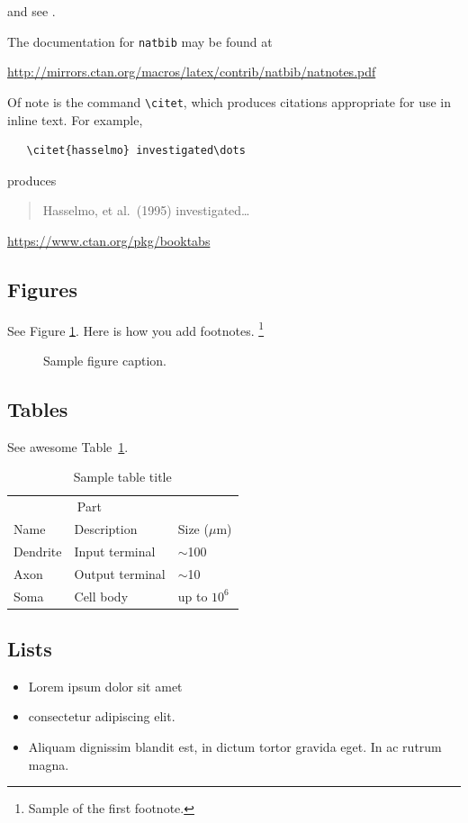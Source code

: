 \documentclass{article}
\begin{document}
\lipsum[8] \cite{Liberzon2012CalculusOV} and see \cite{hadash2018estimate}.

The documentation for \verb+natbib+ may be found at
\begin{center}
  \url{http://mirrors.ctan.org/macros/latex/contrib/natbib/natnotes.pdf}
\end{center}
Of note is the command \verb+\citet+, which produces citations
appropriate for use in inline text.  For example,
\begin{verbatim}
   \citet{hasselmo} investigated\dots
\end{verbatim}
produces
\begin{quote}
  Hasselmo, et al.\ (1995) investigated\dots
\end{quote}

\begin{center}
  \url{https://www.ctan.org/pkg/booktabs}
\end{center}


\subsection{Figures}
\lipsum[10]
See Figure \ref{fig:fig1}. Here is how you add footnotes. \footnote{Sample of the first footnote.}
\lipsum[11]

\begin{figure}
  \centering
  \fbox{\rule[-.5cm]{4cm}{4cm} \rule[-.5cm]{4cm}{0cm}}
  \caption{Sample figure caption.}
  \label{fig:fig1}
\end{figure}

\subsection{Tables}
\lipsum[12]
See awesome Table~\ref{tab:table}.

\begin{table}
 \caption{Sample table title}
  \centering
  \begin{tabular}{lll}
    \toprule
    \multicolumn{2}{c}{Part}                   \\
    \cmidrule(r){1-2}
    Name     & Description     & Size ($\mu$m) \\
    \midrule
    Dendrite & Input terminal  & $\sim$100     \\
    Axon     & Output terminal & $\sim$10      \\
    Soma     & Cell body       & up to $10^6$  \\
    \bottomrule
  \end{tabular}
  \label{tab:table}
\end{table}

\subsection{Lists}
\begin{itemize}
\item Lorem ipsum dolor sit amet
\item consectetur adipiscing elit.
\item Aliquam dignissim blandit est, in dictum tortor gravida eget. In ac rutrum magna.
\end{itemize}




\end{document}
